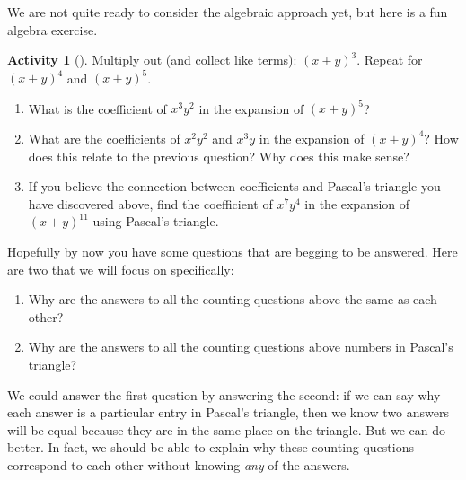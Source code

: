 \documentclass[10pt,]{book}
\theoremstyle{plain}
\theoremstyle{definition}
\theoremstyle{definition}
\theoremstyle{definition}
\newtheorem{activity}[project]{Activity}
\numberwithin{equation}{chapter}
\begin{document}
\hypertarget{p-43}{}%
We are not quite ready to consider the algebraic approach yet, but here is a fun algebra exercise.%
\begin{activity}[]\label{activity-5}
\hypertarget{p-44}{}%
Multiply out (and collect like terms): \((x+y)^3\).  Repeat for \((x+y)^4\) and \((x+y)^5\).%
\begin{enumerate}[font=\bfseries,label=(\alph*),ref=\alph*]
\item\label{task-16} \hypertarget{p-45}{}%
What is the coefficient of \(x^3y^2\) in the expansion of \((x+y)^5\)?%
\item\label{task-17} \hypertarget{p-46}{}%
What are the coefficients of \(x^2y^2\) and \(x^3y\) in the expansion of \((x+y)^4\)?  How does this relate to the previous question?  Why does this make sense?%
\item\label{task-18} \hypertarget{p-47}{}%
If you believe the connection between coefficients and Pascal's triangle you have discovered above, find the coefficient of \(x^7y^4\) in the expansion of \((x+y)^{11}\) using Pascal's triangle.%
\end{enumerate}
\end{activity}
\hypertarget{p-48}{}%
Hopefully by now you have some questions that are begging to be answered.  Here are two that we will focus on specifically: \leavevmode%
\begin{enumerate}
\item\hypertarget{li-4}{}\hypertarget{p-49}{}%
Why are the answers to all the counting questions above the same as each other?%
\item\hypertarget{li-5}{}\hypertarget{p-50}{}%
Why are the answers to all the counting questions above numbers in Pascal's triangle?%
\end{enumerate}
%
\par
\hypertarget{p-51}{}%
We could answer the first question by answering the second: if we can say why each answer is a particular entry in Pascal's triangle, then we know two answers will be equal because they are in the same place on the triangle.  But we can do better.  In fact, we should be able to explain why these counting questions correspond to each other without knowing \emph{any} of the answers.%
\end{document}
